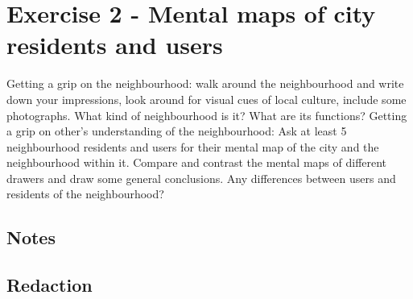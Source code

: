 \documentclass{article}
\begin{document}
\section{Exercise 2 - Mental maps of city residents and users}

\begin{outline}
	\1 Getting a grip on the neighbourhood: walk around the neighbourhood and write down your impressions, look around for visual cues of local culture, include some photographs. What kind of neighbourhood is it? What are its functions?
	\1 Getting a grip on other’s understanding of the neighbourhood: Ask at least 5 neighbourhood residents and users for their mental map of the city and the neighbourhood within it.
	\1 Compare and contrast the mental maps of different drawers and draw some general conclusions. Any differences between users and residents of the neighbourhood? 
\end{outline}

\subsection{Notes}

\subsection{Redaction}











\begin{outline}
	\1 
\end{outline}
\end{document}
